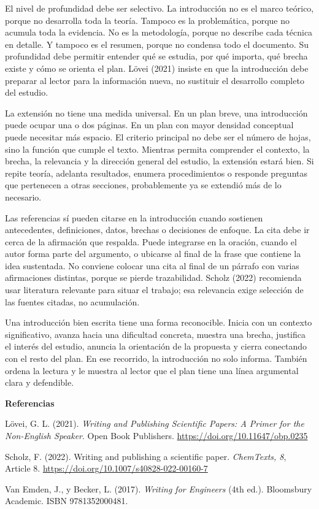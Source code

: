\documentclass[11pt]{article}
\begin{document}
El nivel de profundidad debe ser selectivo. La introducción no es el marco teórico, porque no desarrolla toda la teoría. Tampoco es la problemática, porque no acumula toda la evidencia. No es la metodología, porque no describe cada técnica en detalle. Y tampoco es el resumen, porque no condensa todo el documento. Su profundidad debe permitir entender qué se estudia, por qué importa, qué brecha existe y cómo se orienta el plan. Lövei (2021) insiste en que la introducción debe preparar al lector para la información nueva, no sustituir el desarrollo completo del estudio.

La extensión no tiene una medida universal. En un plan breve, una introducción puede ocupar una o dos páginas. En un plan con mayor densidad conceptual puede necesitar más espacio. El criterio principal no debe ser el número de hojas, sino la función que cumple el texto. Mientras permita comprender el contexto, la brecha, la relevancia y la dirección general del estudio, la extensión estará bien. Si repite teoría, adelanta resultados, enumera procedimientos o responde preguntas que pertenecen a otras secciones, probablemente ya se extendió más de lo necesario.

Las referencias sí pueden citarse en la introducción cuando sostienen antecedentes, definiciones, datos, brechas o decisiones de enfoque. La cita debe ir cerca de la afirmación que respalda. Puede integrarse en la oración, cuando el autor forma parte del argumento, o ubicarse al final de la frase que contiene la idea sustentada. No conviene colocar una cita al final de un párrafo con varias afirmaciones distintas, porque se pierde trazabilidad. Scholz (2022) recomienda usar literatura relevante para situar el trabajo; esa relevancia exige selección de las fuentes citadas, no acumulación.

Una introducción bien escrita tiene una forma reconocible. Inicia con un contexto significativo, avanza hacia una dificultad concreta, muestra una brecha, justifica el interés del estudio, anuncia la orientación de la propuesta y cierra conectando con el resto del plan. En ese recorrido, la introducción no solo informa. También ordena la lectura y le muestra al lector que el plan tiene una línea argumental clara y defendible.

\vspace{0.5em}
\textbf{Referencias}

Lövei, G. L. (2021). \textit{Writing and Publishing Scientific Papers: A Primer for the Non-English Speaker}. Open Book Publishers. \url{https://doi.org/10.11647/obp.0235}

Scholz, F. (2022). Writing and publishing a scientific paper. \textit{ChemTexts, 8}, Article 8. \url{https://doi.org/10.1007/s40828-022-00160-7}

Van Emden, J., y Becker, L. (2017). \textit{Writing for Engineers} (4th ed.). 
Bloomsbury Academic.
ISBN 9781352000481.
\end{document}
